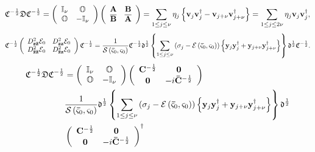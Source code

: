 \documentclass[aps,preprint]{revtex4}%
\begin{document}
\begin{equation}
\mathfrak{C}^{-\frac{1}{2}}\mathfrak{DC}^{-\frac{1}{2}}=\left(
\begin{array}
[c]{cc}%
\mathbb{I}_{\nu} & \mathbb{O}\\
\mathbb{O} & -\mathbb{I}_{\nu}%
\end{array}
\right)  \left(
\begin{array}
[c]{cc}%
\mathbf{A} & \mathbf{B}\\
\overline{\mathbf{B}} & \overline{\mathbf{A}}%
\end{array}
\right)  =\sum_{1\leq j\leq\nu}\eta_{j}\left\{  \mathbf{v}_{j}\mathbf{v}%
_{j}^{\dagger}-\mathbf{v}_{j+\nu}\mathbf{v}_{j+\nu}^{\dagger}\right\}
=\sum_{1\leq j\leq2\nu}\eta_{j}\mathbf{v}_{j}\mathbf{v}_{j}^{\dagger},
\end{equation}%
\begin{equation}
\mathfrak{C}^{-\frac{1}{2}}\left(
\begin{array}
[c]{cc}%
D_{\mathbf{z\bar{z}}}^{2}\mathcal{E}_{0} & D_{\mathbf{zz}}^{2}\mathcal{E}%
_{0}\\
D_{\mathbf{\bar{z}\bar{z}}}^{2}\mathcal{E}_{0} & D_{\mathbf{\bar{z}z}}%
^{2}\mathcal{E}_{0}%
\end{array}
\right)  \mathfrak{C}^{-\frac{1}{2}}=\frac{1}{\mathcal{S}\left(
\mathbf{\bar{\varsigma}}_{0},\mathbf{\varsigma}_{0}\right)  }\mathfrak{C}%
^{-\frac{1}{2}}\mathfrak{\Delta}^{\frac{1}{2}}\left\{  \sum_{1\leq j\leq\nu
}\left(  \sigma_{j}-\mathcal{E}\left(  \mathbf{\bar{\varsigma}}_{0}%
,\mathbf{\varsigma}_{0}\right)  \right)  \left\{  \mathbf{y}_{j}\mathbf{y}%
_{j}^{\dagger}+\mathbf{y}_{j+\nu}\mathbf{y}_{j+\nu}^{\dagger}\right\}
\right\}  \mathfrak{\Delta}^{\frac{1}{2}}\mathfrak{C}^{-\frac{1}{2}}.
\end{equation}%
\begin{align}
\mathfrak{C}^{-\frac{1}{2}}\mathfrak{DC}^{-\frac{1}{2}}  & =\left(
\begin{array}
[c]{cc}%
\mathbb{I}_{\nu} & \mathbb{O}\\
\mathbb{O} & -\mathbb{I}_{\nu}%
\end{array}
\right)  \left(
\begin{array}
[c]{cc}%
\mathbf{C}^{-\frac{1}{2}} & \mathbf{0}\\
\mathbf{0} & -i\mathbf{\bar{C}}^{-\frac{1}{2}}%
\end{array}
\right)  \\
& \frac{1}{\mathcal{S}\left(  \mathbf{\bar{\varsigma}}_{0},\mathbf{\varsigma
}_{0}\right)  }\mathfrak{\Delta}^{\frac{1}{2}}\left\{  \sum_{1\leq j\leq\nu
}\left(  \sigma_{j}-\mathcal{E}\left(  \mathbf{\bar{\varsigma}}_{0}%
,\mathbf{\varsigma}_{0}\right)  \right)  \left\{  \mathbf{y}_{j}\mathbf{y}%
_{j}^{\dagger}+\mathbf{y}_{j+\nu}\mathbf{y}_{j+\nu}^{\dagger}\right\}
\right\}  \mathfrak{\Delta}^{\frac{1}{2}}\\
& \left(
\begin{array}
[c]{cc}%
\mathbf{C}^{-\frac{1}{2}} & \mathbf{0}\\
\mathbf{0} & -i\mathbf{\bar{C}}^{-\frac{1}{2}}%
\end{array}
\right)  ^{\dagger}%
\end{align}%
\end{document}
